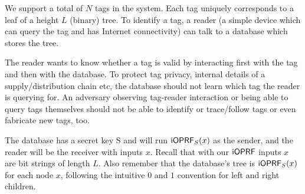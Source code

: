 \documentclass{article}
\begin{document}
We support a total of $N$ tags in the system. Each tag uniquely
corresponds to a leaf of a height $L$ (binary) tree. To identify a
tag, a reader (a simple device which can query the tag and has
Internet connectivity) can talk to a database which stores the tree.

The reader wants to know whether a tag is valid by interacting first
with the tag and then with the database. To protect tag privacy,
internal details of a supply/distribution chain etc, the database
should not learn which tag the reader is querying for. An adversary
observing tag-reader interaction or being able to query tags
themselves should not be able to identify or trace/follow tags or
even fabricate new tags, too.


The database has a secret key S and will run $\mathsf{i}\mathsf{OPRF}_S(x)$ as the
sender, and the reader will be the receiver with inputs $x$. Recall
that with our $\mathsf{i}\mathsf{OPRF}$ inputs $x$ are bit strings of length $L$. Also
remember that the database's tree is $\mathsf{i}\mathsf{OPRF}_S(x)$ for each node $x$,
following the intuitive $0$ and $1$ convention for left and right
children.
\end{document}
